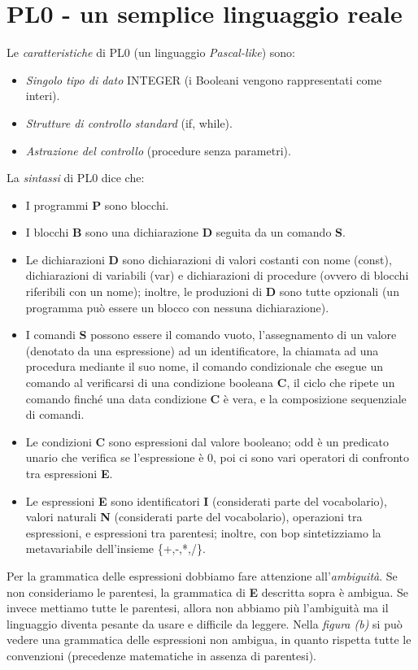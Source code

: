 \documentclass[a4paper,oneside,titlepage]{book}
\begin{document}
\section{PL0 - un semplice linguaggio reale}
Le \textit{caratteristiche} di PL0 (un linguaggio \textit{Pascal-like}) sono:
\begin{itemize}
	\item \textit{Singolo tipo di dato} INTEGER (i Booleani vengono rappresentati come interi).
	\item \textit{Strutture di controllo standard} (if, while).
	\item \textit{Astrazione del controllo} (procedure senza parametri).
\end{itemize}
La \textit{sintassi} di PL0 dice che:
\begin{itemize}
	\item I programmi \textbf{P} sono blocchi.
	\item I blocchi \textbf{B} sono una dichiarazione \textbf{D} seguita da un comando \textbf{S}.
	\item Le dichiarazioni \textbf{D} sono dichiarazioni di valori costanti con nome (const), dichiarazioni di variabili (var) e dichiarazioni di procedure (ovvero di blocchi riferibili con un nome); inoltre, le produzioni di \textbf{D} sono tutte opzionali (un programma può essere un blocco con nessuna dichiarazione).
	\item I comandi \textbf{S} possono essere il comando vuoto, l'assegnamento di un valore (denotato da una espressione) ad un identificatore, la chiamata ad una procedura mediante il suo nome, il comando condizionale che esegue un comando al verificarsi di una condizione booleana \textbf{C}, il ciclo che ripete un comando finché una data condizione \textbf{C} è vera, e la composizione sequenziale di comandi.
	\item Le condizioni \textbf{C} sono espressioni dal valore booleano; odd è un predicato unario che verifica se l'espressione è 0, poi ci sono vari operatori di confronto tra espressioni \textbf{E}.
	\item Le espressioni \textbf{E} sono identificatori \textbf{I} (considerati parte del vocabolario), valori naturali \textbf{N} (considerati parte del vocabolario), operazioni tra espressioni, e espressioni tra parentesi; inoltre, con bop sintetizziamo la metavariabile dell'insieme \{+,-,*,/\}.
\end{itemize}
Per la grammatica delle espressioni dobbiamo fare attenzione all'\textit{ambiguità}. Se non consideriamo le parentesi, la grammatica di \textbf{E} descritta sopra è ambigua. Se invece mettiamo tutte le parentesi, allora non abbiamo più l'ambiguità ma il linguaggio diventa pesante da usare e difficile da leggere. Nella \textit{figura (b)} si può vedere una grammatica delle espressioni non ambigua, in quanto rispetta tutte le convenzioni (precedenze matematiche in assenza di parentesi).
\end{document}
